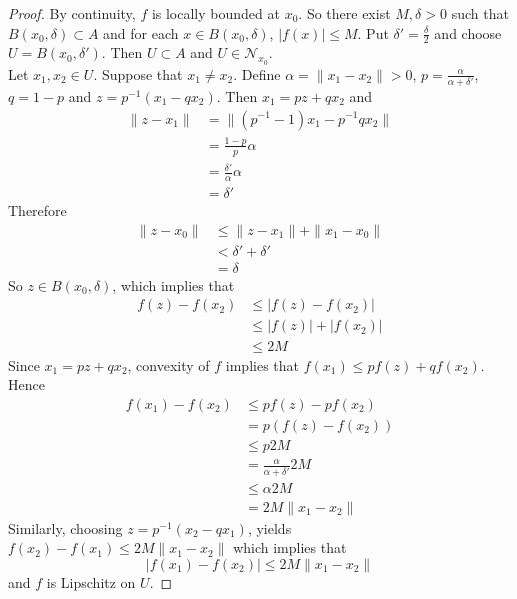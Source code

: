 \documentclass[12pt]{amsart}
\theoremstyle{definition}
\newcommand{\al}{\alpha}
\newcommand{\del}{\delta}
\newcommand{\MN}{\mathcal{N}}
\DeclareMathOperator*{\0}{\mbf{0}}
\DeclareMathOperator*{\1}{\mbf{1}}
\begin{document}
	\begin{proof}
	By continuity, $f$ is locally bounded at $x_0$. So there exist $M, \del >0$ such that $B(x_0, \del) \subset A$ and for each $x \in B(x_0, \del)$, $|f(x)| \leq M$. Put $\del' = \frac{\del}{2}$ and choose $U = B(x_0, \del')$. Then $U \subset A$ and $U \in \MN_{x_0}$. \\
	Let $x_1, x_2 \in U$. Suppose that $x_1 \neq x_2$. Define $\al = \|x_1 - x_2\| >0$, $p = \frac{\al}{\al + \del'}$, $q = 1-p$ and $z = p^{-1}(x_1 - qx_2)$. Then $x_1 = pz + qx_2$ and 
	\begin{align*}
	\|z - x_1\| 
	&= \|(p^{-1} - 1)x_1 - p^{-1}qx_2\| \\
	&= \frac{1-p}{p} \al \\
	&= \frac{\del'}{\al} \al \\
	&= \del ' 
	\end{align*}
	Therefore 
	\begin{align*}
	\|z - x_0\| 
	& \leq \|z - x_1\| + \|x_1 - x_0\| \\
	& <  \del '  + \del '  \\
	&= \del
\end{align*}	  
	So $z \in B(x_0, \del)$, which implies that 
	\begin{align*}
	f(z) - f(x_2) 
	& \leq |f(z) - f(x_2)|\\ 
	&\leq |f(z)| + |f(x_2)| \\
	&\leq 2M
\end{align*}		
	Since $x_1 = pz + qx_2$, convexity of $f$ implies that $f(x_1) \leq pf(z) + qf(x_2)$. Hence 
	\begin{align*}
	f(x_1) - f(x_2) 
	& \leq pf(z) -pf(x_2) \\
	&= p(f(z) - f(x_2)) \\
	& \leq p 2M \\
	&= \frac{\al}{\al + \del'} 2M \\
	& \leq \al 2M \\
	&= 2M \|x_1 - x_2 \|
	\end{align*}
	Similarly, choosing $z = p^{-1}(x_2 - qx_1)$, yields $f(x_2) - f(x_1) \leq 2M \|x_1 - x_2 \|$ which implies that $$|f(x_1) - f(x_2)| \leq 2M \|x_1 - x_2 \|$$ and $f$ is Lipschitz on $U$. 
 	\end{proof}


	
	
	
	
	
	
	
	
	
	
\end{document}
